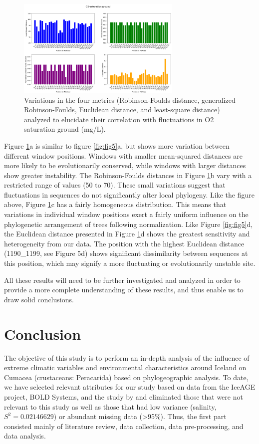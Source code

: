 \begin{figure}[]
    \centering
    \includegraphics[width=0.7\textwidth]{figure6.png}
    \caption{Variations in the four metrics (Robinson-Foulds distance, generalized Robinson-Foulds, Euclidean distance, and least-square distance) analyzed to elucidate their correlation with fluctuations in O2 saturation ground (mg/L). \label{fig:fig6}}
\end{figure}

Figure \ref{fig:fig6}a is similar to figure \ref{fig:fig5}a, but shows more variation between different window positions. Windows with smaller mean-squared distances are more likely to be evolutionarily conserved, while windows with larger distances show greater instability. The Robinson-Foulds distances in Figure \ref{fig:fig6}b vary with a restricted range of values (50 to 70). These small variations suggest that fluctuations in sequences do not significantly alter local phylogeny. Like the figure above, Figure \ref{fig:fig6}c has a fairly homogeneous distribution. This means that variations in individual window positions exert a fairly uniform influence on the phylogenetic arrangement of trees following normalization. Like Figure \ref{fig:fig5}d, the Euclidean distance presented in Figure \ref{fig:fig6}d shows the greatest sensitivity and heterogeneity from our data. The position with the highest Euclidean distance (1190_1199, see Figure 5d) shows significant dissimilarity between sequences at this position, which may signify a more fluctuating or evolutionarily unstable site. 

All these results will need to be further investigated and analyzed in order to provide a more complete understanding of these results, and thus enable us to draw solid conclusions.

\section{Conclusion}\label{conclusion}

The objective of this study is to perform an in-depth analysis of the influence of extreme climatic variables and environmental characteristics around Iceland on Cumacea (crustaceans: Peracarida) based on phylogeographic analysis. To date, we have selected relevant attributes for our study based on data from the IceAGE project, BOLD Systems, and the study by \citep{uhlir_adding_2021} and eliminated those that were not relevant to this study as well as those that had low variance (salinity, \( S^2 = 0.02146629 \)) or abundant missing data (>95\%). Thus, the first part consisted mainly of literature review, data collection, data pre-processing, and data analysis.
